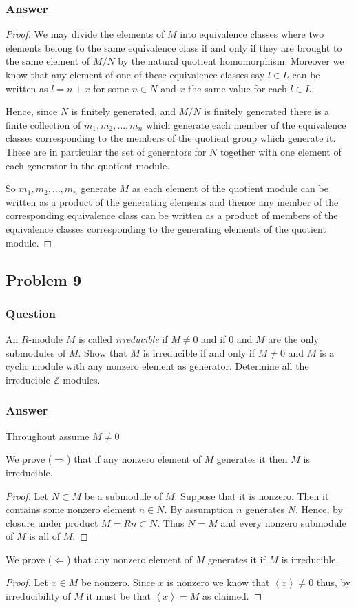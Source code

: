 \documentclass[12pt]{article}
\begin{document}
\subsubsection{Answer}
\begin{proof}
We may divide the elements of $M$ into equivalence classes where two elements belong to the same equivalence class if and only if they are brought to the same element of $M/N$ by the natural quotient homomorphism. Moreover we know that any element of one of these equivalence classes say $l \in L$ can be written as $l = n + x$ for some $n \in N$ and $x$ the same value for each $l \in L$. 

Hence, since $N$ is finitely generated, and $M/N$ is finitely generated there is a finite collection of $m_1,m_2, \dots, m_n$ which generate each member of the equivalence classes corresponding to the members of the quotient group which generate it. These are in particular the set of generators for $N$ together with one element of each generator in the quotient module.

So $m_1,m_2, \dots, m_n$ generate $M$ as each element of the quotient module can be written as a product of the generating elements and thence any member of the corresponding equivalence class can be written as a product of members of the equivalence classes corresponding to the generating elements of the quotient module.
\end{proof}

\subsection{Problem 9}
\subsubsection{Question}
An $R$-module $M$ is called \emph{irreducible} if $M \neq 0$ and if $0$ and $M$ are the only submodules of $M$. Show that $M$ is irreducible if and only if $M \neq 0$ and $M$ is a cyclic module with any nonzero element as generator. Determine all the irreducible $\mathbb{Z}$-modules.
\subsubsection{Answer}
Throughout assume $M \neq 0$

We prove ($\Rightarrow$) that if any nonzero element of $M$ generates it then $M$ is irreducible. 
\begin{proof}
Let $N \subset M$ be a submodule of $M$. Suppose that it is nonzero. Then it contains some nonzero element $n \in N$. By assumption $n$ generates $N$. Hence, by closure under product $M= Rn \subset N$. Thus $N=M$ and every nonzero submodule of $M$ is all of $M$.
\end{proof}
We prove ($\Leftarrow$) that  any nonzero element of $M$ generates it if $M$ is irreducible. 
\begin{proof}
Let $x\in M$ be nonzero. Since $x$ is nonzero we know that $\left< x \right> \neq 0$ thus, by irreducibility of $M$  it must be that $\left< x \right> = M$ as claimed.
\end{proof}
\end{document}

